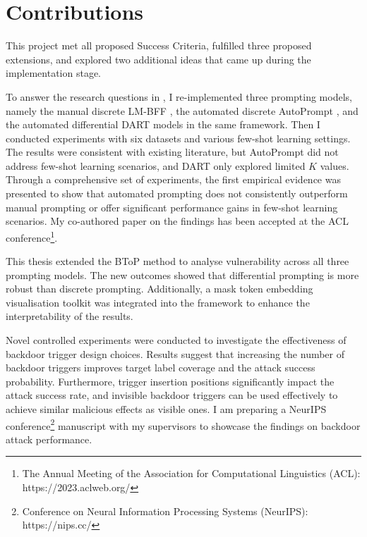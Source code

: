 \section{Contributions}
This project met all proposed Success Criteria, fulfilled three proposed extensions, and explored two additional ideas that came up during the implementation stage. 

To answer the research questions in , I re-implemented three prompting models, namely the manual discrete LM-BFF \cite{Gao20PM}, the automated discrete AutoPrompt \cite{shin2020autoprompt}, and the automated differential DART \cite{zhang2021differentiable} models in the same framework. Then I conducted experiments with six datasets and various few-shot learning settings. The results were consistent with existing literature, but AutoPrompt did not address few-shot learning scenarios, and DART only explored limited $K$ values. Through a comprehensive set of experiments, the first empirical evidence was presented to show that automated prompting does not consistently outperform manual prompting or offer significant performance gains in few-shot learning scenarios. 
My co-authored paper on the findings has been accepted at the ACL conference\footnote{The Annual Meeting of the Association for Computational Linguistics (ACL): https://2023.aclweb.org/}.

This thesis extended the BToP method \cite{Lei22} to analyse vulnerability across all three prompting models. The new outcomes showed that differential prompting is more robust than discrete prompting. Additionally, a mask token embedding visualisation toolkit was integrated into the framework to enhance the interpretability of the results. 

Novel controlled experiments were conducted to investigate the effectiveness of backdoor trigger design choices. Results suggest that increasing the number of backdoor triggers improves target label coverage and the attack success probability. Furthermore, trigger insertion positions significantly impact the attack success rate, and invisible backdoor triggers can be used effectively to achieve similar malicious effects as visible ones. I am preparing a NeurIPS conference\footnote{Conference on Neural Information Processing Systems (NeurIPS): https://nips.cc/} manuscript with my supervisors to showcase the findings on backdoor attack performance.